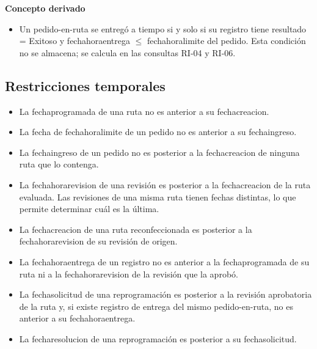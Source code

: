 \documentclass[11pt,a4paper]{article}
\newcommand{\ubrk}{\textunderscore\allowbreak}
\newcommand{\campo}[1]{\textnormal{\ttfamily\let\_\ubrk #1}}
\begin{document}
\textbf{Concepto derivado}
\begin{itemize}
\item Un pedido-en-ruta se entregó a tiempo si y solo si su registro tiene \campo{resultado} = Exitoso y \campo{fecha\_hora\_entrega} $\le$ \campo{fecha\_hora\_limite} del pedido. Esta condición no se almacena; se calcula en las consultas RI-04 y RI-06.
\end{itemize}

\subsection{Restricciones temporales}
\begin{itemize}
\item La \campo{fecha\_programada} de una ruta no es anterior a su \campo{fecha\_creacion}.
\item La fecha de \campo{fecha\_hora\_limite} de un pedido no es anterior a su \campo{fecha\_ingreso}.
\item La \campo{fecha\_ingreso} de un pedido no es posterior a la \campo{fecha\_creacion} de ninguna ruta que lo contenga.
\item La \campo{fecha\_hora\_revision} de una revisión es posterior a la \campo{fecha\_creacion} de la ruta evaluada. Las revisiones de una misma ruta tienen fechas distintas, lo que permite determinar cuál es la última.
\item La \campo{fecha\_creacion} de una ruta reconfeccionada es posterior a la \campo{fecha\_hora\_revision} de su revisión de origen.
\item La \campo{fecha\_hora\_entrega} de un registro no es anterior a la \campo{fecha\_programada} de su ruta ni a la \campo{fecha\_hora\_revision} de la revisión que la aprobó.
\item La \campo{fecha\_solicitud} de una reprogramación es posterior a la revisión aprobatoria de la ruta y, si existe registro de entrega del mismo pedido-en-ruta, no es anterior a su \campo{fecha\_hora\_entrega}.
\item La \campo{fecha\_resolucion} de una reprogramación es posterior a su \campo{fecha\_solicitud}.
\end{itemize}
\end{document}
